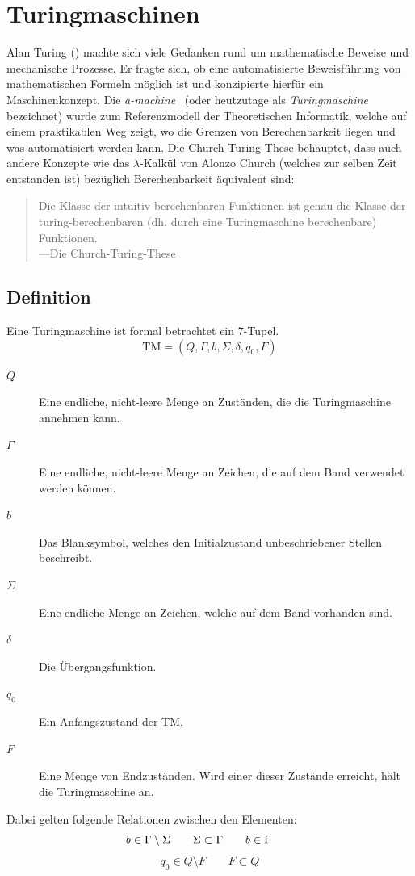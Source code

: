 \chapter{Turingmaschinen}
\label{sec:turingmachine}
\newcommand{\blank}{b}
%
Alan Turing () machte sich viele Gedanken rund um mathematische Beweise und mechanische Prozesse. Er fragte sich, ob eine automatisierte Beweisführung von mathematischen Formeln möglich ist und konzipierte hierfür ein Maschinenkonzept. Die \emph{a-machine}~\cite{Turing01011937} (oder heutzutage als \emph{Turingmaschine} bezeichnet) wurde zum Referenzmodell der Theoretischen Informatik, welche auf einem praktikablen Weg zeigt, wo die Grenzen von Berechenbarkeit liegen und was automatisiert werden kann. Die Church-Turing-These behauptet, dass auch andere Konzepte wie das $\lambda$-Kalkül von Alonzo Church (welches zur selben Zeit entstanden ist) bezüglich Berechenbarkeit äquivalent sind:
%
\begin{quotation}
 Die Klasse der intuitiv berechenbaren Funktionen ist genau die Klasse der turing-berechenbaren (dh. durch eine Turingmaschine berechenbare) Funktionen. \\
 ---Die Church-Turing-These
\end{quotation}
%
\section{Definition}
%
Eine Turingmaschine ist formal betrachtet ein 7-Tupel.
\begin{equation}
  \text{TM} = (Q, \Gamma, \blank, \Sigma, \delta, q_0, F)
\end{equation}
%
\begin{description}
 \item[$Q$] Eine endliche, nicht-leere Menge an Zuständen, die die Turingmaschine annehmen kann.
 \item[$\Gamma$] Eine endliche, nicht-leere Menge an Zeichen, die auf dem Band verwendet werden können.
 \item[$\blank$] Das Blanksymbol, welches den Initialzustand unbeschriebener Stellen beschreibt.
 \item[$\Sigma$] Eine endliche Menge an Zeichen, welche auf dem Band vorhanden sind.
 \item[$\delta$] Die Übergangsfunktion.
 \item[$q_0$] Ein Anfangszustand der TM.
 \item[$F$] Eine Menge von Endzuständen. Wird einer dieser Zustände erreicht, hält die Turingmaschine an.
\end{description}
%
Dabei gelten folgende Relationen zwischen den Elementen:
\begin{displaymath}
  \blank \in \Gamma \setminus \Sigma  \qquad
  \Sigma \subset \Gamma  \mathspace  \blank \in \Gamma  \qquad
\end{displaymath}
\begin{displaymath}
  q_0 \in Q \setminus F \qquad
  F \subset Q
\end{displaymath}

